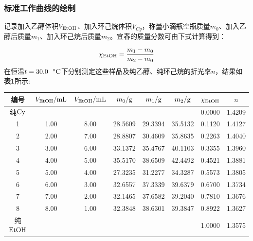 \documentclass[12pt]{article}
\begin{document}
 			\subsubsection{标准工作曲线的绘制}
			 记录加入乙醇体积$V_{\rm EtOH}$、加入环己烷体积$V_{Cy}$，称量小滴瓶空瓶质量$m_{0}$、加入乙醇后质量$m_{1}$、加入环己烷后质量$m_{2}$。宜春的质量分数可由下式计算得到：\par
			 $$
			 \chi_{\ce{EtOH}}=\frac{m_{1}-m_{0}}{m_{2}-m_{0}}
			 $$
			 在恒温$t=30.0\ \ {\rm ^{\circ}C}$下分别测定这些样品及纯乙醇、纯环己烷的折光率$n$，结果如\textbf{表1}所示:\par
			 \begin{table}[h]
				 \centering
				 \begin{tabular}{cccccccc}
					 \toprule
					 编号 & $V_{\rm EtOH}/{\rm mL}$ & $V_{\rm EtOH}/{\rm mL}$ & $m_{0}/{\rm g}$ &$m_{1}/{\rm g}$&$m_{2}/{\rm g}$& $\chi_{\ce{EtOH}}$&$n$ \\
					 \midrule
					 纯$\rm Cy$ &      &      &         &         &         & 0.0000 & 1.4209 \\
					 1     		& 1.00 & 8.00 & 28.5609 & 29.3394 & 35.5132 & 0.1120 & 1.4127 \\
					 2     		& 2.00 & 7.00 & 28.8807 & 30.4609 & 35.8635 & 0.2263 & 1.4040 \\
					 3     		& 3.00 & 6.00 & 33.1372 & 35.4767 & 40.1103 & 0.3355 & 1.3960 \\
					 4     		& 4.00 & 5.00 & 35.5170 & 38.6509 & 42.4492 & 0.4521 & 1.3881 \\
					 5     		& 5.00 & 4.00 & 27.3235 & 31.2277 & 34.3287 & 0.5573 & 1.3805 \\
					 6     		& 6.00 & 3.00 & 32.6557 & 37.3339 & 39.6379 & 0.6700 & 1.3734 \\
					 7     		& 7.00 & 2.00 & 32.1465 & 37.6582 & 39.2040 & 0.7810 & 1.3676 \\
					 8     		& 8.00 & 1.00 & 32.3848 & 38.6301 & 39.3847 & 0.8922 & 1.3627 \\
					 纯${\rm EtOH}$ &  &      &         &         &         & 1.0000 & 1.3575\\
					 \bottomrule
				 \end{tabular}
			 \end{table}
			 \par
\end{document}
